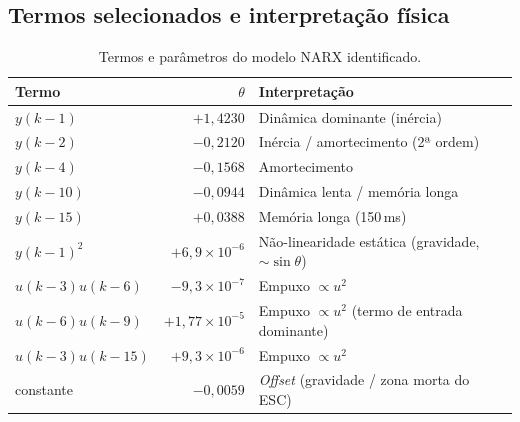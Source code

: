 \documentclass[12pt,a4paper]{article}
\begin{document}
\subsection{Termos selecionados e interpretação física}

\begin{table}[H]
    \centering
    \caption{Termos e parâmetros do modelo NARX identificado.}
    \label{tab:narx}
    \begin{tabular}{@{}lrl@{}}
        \toprule
        \textbf{Termo} & \textbf{$\theta$} & \textbf{Interpretação} \\ \midrule
        $y(k-1)$          & $+1{,}4230$                & Dinâmica dominante (inércia) \\
        $y(k-2)$          & $-0{,}2120$                & Inércia / amortecimento (2ª ordem) \\
        $y(k-4)$          & $-0{,}1568$                & Amortecimento \\
        $y(k-10)$         & $-0{,}0944$                & Dinâmica lenta / memória longa \\
        $y(k-15)$         & $+0{,}0388$                & Memória longa (150\,ms) \\
        $y(k-1)^2$        & $+6{,}9\times10^{-6}$      & Não-linearidade estática (gravidade, $\sim\sin\theta$) \\
        $u(k-3)u(k-6)$    & $-9{,}3\times10^{-7}$      & Empuxo $\propto u^2$ \\
        $u(k-6)u(k-9)$    & $+1{,}77\times10^{-5}$     & Empuxo $\propto u^2$ (termo de entrada dominante) \\
        $u(k-3)u(k-15)$   & $+9{,}3\times10^{-6}$      & Empuxo $\propto u^2$ \\
        constante         & $-0{,}0059$                & \textit{Offset} (gravidade / zona morta do ESC) \\ \bottomrule
    \end{tabular}
\end{table}
\end{document}
